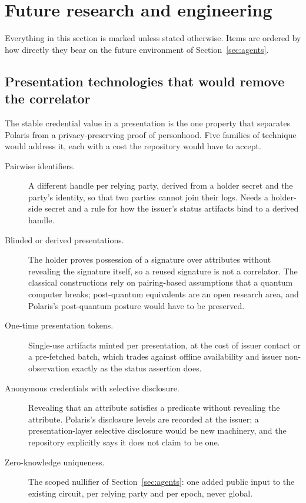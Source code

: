\section{Future research and engineering}
\label{sec:research}

Everything in this section is marked \sFut{} unless stated otherwise. Items are ordered by how
directly they bear on the future environment of Section~\ref{sec:agents}.

\subsection{Presentation technologies that would remove the correlator}

The stable credential value in a presentation is the one property that separates Polaris from a
privacy-preserving proof of personhood. Five families of technique would address it, each with a
cost the repository would have to accept.

\begin{description}
  \item[Pairwise identifiers.] A different handle per relying party, derived from a holder secret
    and the party's identity, so that two parties cannot join their logs. Needs a holder-side secret
    and a rule for how the issuer's status artifacts bind to a derived handle.
  \item[Blinded or derived presentations.] The holder proves possession of a signature over
    attributes without revealing the signature itself, so a reused signature is not a correlator.
    The classical constructions rely on pairing-based assumptions that a quantum computer breaks;
    post-quantum equivalents are an open research area, and Polaris's post-quantum posture would
    have to be preserved.
  \item[One-time presentation tokens.] Single-use artifacts minted per presentation, at the cost of
    issuer contact or a pre-fetched batch, which trades against offline availability and issuer
    non-observation exactly as the status assertion does.
  \item[Anonymous credentials with selective disclosure.] Revealing that an attribute satisfies a
    predicate without revealing the attribute. Polaris's disclosure levels are recorded at the
    issuer; a presentation-layer selective disclosure would be new machinery, and the repository
    explicitly says it does not claim to be one.
  \item[Zero-knowledge uniqueness.] The scoped nullifier of Section~\ref{sec:agents}: one added
    public input to the existing circuit, per relying party and per epoch, never global.
\end{description}

